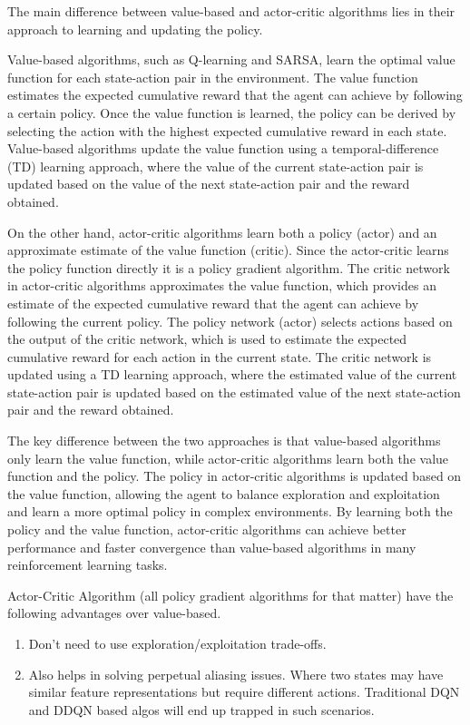 \documentclass{article} %
\begin{document}
The main difference between value-based and actor-critic algorithms lies in their approach to learning and updating the policy.

Value-based algorithms, such as Q-learning and SARSA, learn the optimal value function for each state-action pair in the environment. The value function estimates the expected cumulative reward that the agent can achieve by following a certain policy. Once the value function is learned, the policy can be derived by selecting the action with the highest expected cumulative reward in each state. Value-based algorithms update the value function using a temporal-difference (TD) learning approach, where the value of the current state-action pair is updated based on the value of the next state-action pair and the reward obtained.

On the other hand, actor-critic algorithms learn both a policy (actor) and an approximate estimate of the value function (critic). Since the actor-critic learns the policy function directly it is a policy gradient algorithm. The critic network in actor-critic algorithms approximates the value function, which provides an estimate of the expected cumulative reward that the agent can achieve by following the current policy. The policy network (actor) selects actions based on the output of the critic network, which is used to estimate the expected cumulative reward for each action in the current state. The critic network is updated using a TD learning approach, where the estimated value of the current state-action pair is updated based on the estimated value of the next state-action pair and the reward obtained.  \cite{barto1983neuronlike} \cite{NIPS1994_23ce1851}

The key difference between the two approaches is that value-based algorithms only learn the value function, while actor-critic algorithms learn both the value function and the policy. The policy in actor-critic algorithms is updated based on the value function, allowing the agent to balance exploration and exploitation and learn a more optimal policy in complex environments. By learning both the policy and the value function, actor-critic algorithms can achieve better performance and faster convergence than value-based algorithms in many reinforcement learning tasks.

Actor-Critic Algorithm (all policy gradient algorithms for that matter) have the following advantages over value-based.
\begin{enumerate}
\item Don't need to use exploration/exploitation trade-offs.
\item Also helps in solving perpetual aliasing issues. Where two states may have similar feature representations but require different actions. Traditional DQN and DDQN based algos will end up trapped in such scenarios.
\end{enumerate}
\end{document}
